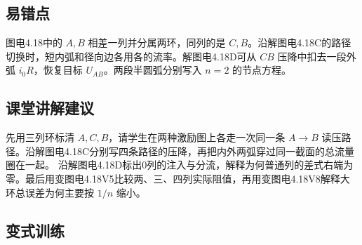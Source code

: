 \documentclass[UTF8,fontset=fandol,a4paper,11pt]{ctexart}
\begin{document}
\subsection*{易错点}

图电4.18中的 $A,B$ 相差一列并分属两环，同列的是 $C,B$。沿解图电4.18C的路径切换时，短内弧和径向边各用各的流率。解图电4.18D可从 $CB$ 压降中扣去一段外弧 $i_0R$，恢复目标 $U_{AB}$。两段半圆弧分别写入 $n=2$ 的节点方程。



\subsection*{课堂讲解建议}

先用三列环标清 $A,C,B$，请学生在两种激励图上各走一次同一条 $A\to B$ 读压路径。沿解图电4.18C分别写四条路径的压降，再把内外两弧穿过同一截面的总流量圈在一起。
沿解图电4.18D标出0列的注入与分流，解释为何普通列的差式右端为零。最后用变图电4.18V5比较两、三、四列实际阻值，再用变图电4.18V8解释大环总误差为何主要按 $1/n$ 缩小。


\subsection*{变式训练}
\end{document}
